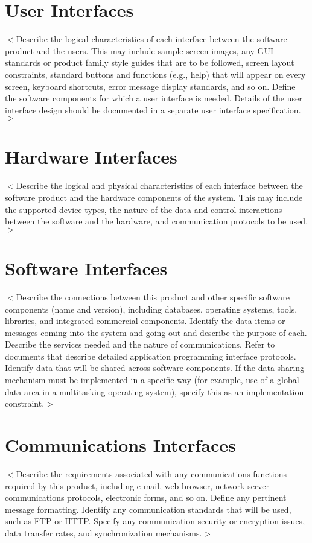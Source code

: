 \documentclass{scrreprt}
\begin{document}
\section{User Interfaces}
$<$Describe the logical characteristics of each interface between the software 
product and the users. This may include sample screen images, any GUI standards 
or product family style guides that are to be followed, screen layout 
constraints, standard buttons and functions (e.g., help) that will appear on 
every screen, keyboard shortcuts, error message display standards, and so on.  
Define the software components for which a user interface is needed. Details of 
the user interface design should be documented in a separate user interface 
specification.$>$

\section{Hardware Interfaces}
$<$Describe the logical and physical characteristics of each interface between 
the software product and the hardware components of the system. This may include 
the supported device types, the nature of the data and control interactions 
between the software and the hardware, and communication protocols to be 
used.$>$

\section{Software Interfaces}
$<$Describe the connections between this product and other specific software 
components (name and version), including databases, operating systems, tools, 
libraries, and integrated commercial components. Identify the data items or 
messages coming into the system and going out and describe the purpose of each.  
Describe the services needed and the nature of communications. Refer to 
documents that describe detailed application programming interface protocols.  
Identify data that will be shared across software components. If the data 
sharing mechanism must be implemented in a specific way (for example, use of a 
global data area in a multitasking operating system), specify this as an 
implementation constraint.$>$

\section{Communications Interfaces}
$<$Describe the requirements associated with any communications functions 
required by this product, including e-mail, web browser, network server 
communications protocols, electronic forms, and so on. Define any pertinent 
message formatting. Identify any communication standards that will be used, such 
as FTP or HTTP. Specify any communication security or encryption issues, data 
transfer rates, and synchronization mechanisms.$>$
\end{document}
